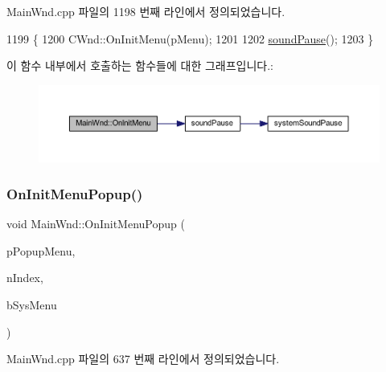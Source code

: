 Main\+Wnd.\+cpp 파일의 1198 번째 라인에서 정의되었습니다.


\begin{DoxyCode}
1199 \{
1200   CWnd::OnInitMenu(pMenu);
1201   
1202   \mbox{\hyperlink{_sound_8cpp_a0716e7957671de324eeaa4ac1729d6b7}{soundPause}}();  
1203 \}
\end{DoxyCode}
이 함수 내부에서 호출하는 함수들에 대한 그래프입니다.\+:
\nopagebreak
\begin{figure}[H]
\begin{center}
\leavevmode
\includegraphics[width=350pt]{class_main_wnd_a7bb12340c3ca647cc23d751319302225_cgraph}
\end{center}
\end{figure}
\mbox{\label{class_main_wnd_ad6e6b4e816151f616328de005d5f5a3d}} 
\subsubsection{\texorpdfstring{On\+Init\+Menu\+Popup()}{OnInitMenuPopup()}}
{\footnotesize\ttfamily void Main\+Wnd\+::\+On\+Init\+Menu\+Popup (\begin{DoxyParamCaption}\item[{C\+Menu $\ast$}]{p\+Popup\+Menu,  }\item[{U\+I\+NT}]{n\+Index,  }\item[{B\+O\+OL}]{b\+Sys\+Menu }\end{DoxyParamCaption})\hspace{0.3cm}{\ttfamily [protected]}}



Main\+Wnd.\+cpp 파일의 637 번째 라인에서 정의되었습니다.


